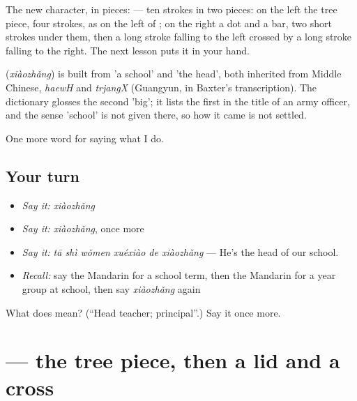 The new character, in pieces:  — ten strokes in two pieces: on the left the tree piece, four strokes, as on the left of ; on the right a dot and a bar, two short strokes under them, then a long stroke falling to the left crossed by a long stroke falling to the right. The next lesson puts it in your hand.

\begin{cousinweb}
\textbf{} (\emph{xiàozhǎng}) is built from  'a school' and  'the head', both inherited from Middle Chinese, \emph{haewH} and \emph{trjangX} (Guangyun, in Baxter's transcription). The dictionary glosses the second 'big'; it lists the first in the title of an army officer, and the sense 'school' is not given there, so how it came is not settled.
\end{cousinweb}

\begin{grammarlens}[title={What you've built}]
One more word for saying what I do.
\end{grammarlens}

\subsection*{Your turn}
\begin{itemize}
\raggedright
  \item \emph{Say it:} \emph{xiàozhǎng}
  \item \emph{Say it:} \emph{xiàozhǎng}, once more
  \item \emph{Say it:} \emph{tā shì wǒmen xuéxiào de xiàozhǎng} — He's the head of our school.
  \item \emph{Recall:} say the Mandarin for a school term, then the Mandarin for a year group at school, then say \emph{xiàozhǎng} again
\end{itemize}

\begin{tcolorbox}[breakable,colback=teal!4,colframe=teal!35!black,title={Before you move on}]
What does  mean? (\textquotedblleft{}Head teacher; principal\textquotedblright{}.) Say it once more.
\end{tcolorbox}
\section[\texorpdfstring{\zh{校} (xiào)}{校 (xiào)}]{ — the tree piece, then a lid and a cross}

\label{lesson:ZH-W248-xiao-school}



